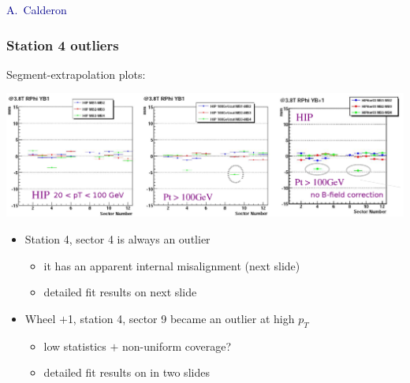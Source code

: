 \documentclass[compress]{beamer}
\begin{document}
\begin{frame}
\begin{columns}
\vspace{0.5 cm}
\end{columns}

\vspace{-\baselineskip}
\hfill \textcolor{darkblue}{A.~Calderon}
\end{frame}

\begin{frame}
\frametitle{Station 4 outliers}

Segment-extrapolation plots:

\vfill
\mbox{\hspace{-0.75 cm}\includegraphics[width=1.15\linewidth]{alicia_outliers.png}}

\begin{itemize}
\item Station 4, sector 4 is always an outlier
\begin{itemize}
\item it has an apparent internal misalignment (next slide)
\item detailed fit results on next slide
\end{itemize}

\item Wheel $+$1, station 4, sector 9 became an outlier at high $p_T$
\begin{itemize}
\item low statistics $+$ non-uniform coverage?
\item detailed fit results on in two slides
\end{itemize}

\end{itemize}
\end{frame}
\end{document}
